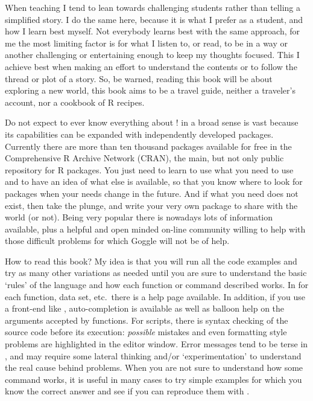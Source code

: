When teaching I tend to lean towards challenging students rather than telling a simplified story. I do the same here, because it is what I prefer as a student, and how I learn best myself. Not everybody learns best with the same approach, for me the most limiting factor is for what I listen to, or read, to be in a way or another challenging or entertaining enough to keep my thoughts focused. This I achieve best when making an effort to understand the contents or to follow the thread or plot of a story. So, be warned, reading this book will be about exploring a new world, this book aims to be a travel guide, neither a traveler's account, nor a cookbook of R recipes.

Do not expect to ever know everything about \Rpgrm! \Rpgrm in a broad sense is vast because its capabilities can be expanded with independently developed packages. Currently there are more than ten thousand packages available for free in the Comprehensive R Archive Network (CRAN), the main, but not only public repository for R packages. You just need to learn to use what you need to use and to have an idea of what else is available, so that you know where to look for packages when your needs change in the future. And if what you need does not exist, then take the plunge, and write your very own package to share with the world (or not). Being \Rpgrm very popular there is nowadays lots of information available, plus a helpful and open minded on-line community willing to help with those difficult problems for which Goggle will not be of help.

How to read this book? My idea is that you will run all the code examples and try as many other variations as needed until you are sure to understand the basic `rules' of the \Rpgrm language and how each function or command described works. In \Rpgrm for each function, data set, etc.\ there is a help page available. In addition, if you use a front-end like \RStudio, auto-completion is available as well as balloon help on the arguments accepted by functions. For scripts, there is syntax checking of the source code before its execution: \emph{possible} mistakes and even formatting style problems are highlighted in the editor window. Error messages tend to be terse in \Rpgrm, and may require some lateral thinking and/or `experimentation' to understand the real cause behind problems. When you are not sure to understand how some command works, it is useful in many cases to try simple examples for which you know the correct answer and see if you can reproduce them with \Rpgrm.


